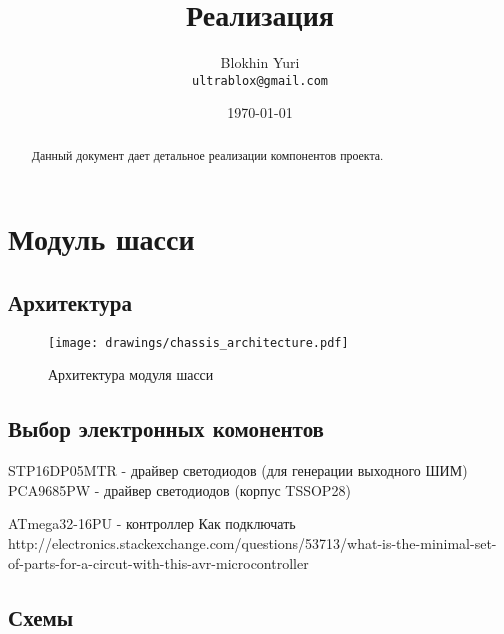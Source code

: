 \documentclass[utf8]{report}
\begin{document}
\title{Реализация}
\author{Blokhin Yuri\\
        \texttt{ultrablox@gmail.com}}
\date{\today}
\maketitle
 
\tableofcontents

\begin{abstract}
Данный документ дает детальное реализации компонентов проекта.
\end{abstract}

\chapter{Модуль шасси}

\section{Архитектура}


\begin{figure}
    \centering
    \texttt{[image: drawings/chassis\_architecture.pdf]}
    \caption{Архитектура модуля шасси}
    \label{fig:hashset}
\end{figure}

\section{Выбор электронных комонентов}

STP16DP05MTR - драйвер светодиодов (для генерации выходного ШИМ)
PCA9685PW - драйвер светодиодов (корпус TSSOP28)

ATmega32-16PU - контроллер
Как подключать http://electronics.stackexchange.com/questions/53713/what-is-the-minimal-set-of-parts-for-a-circut-with-this-avr-microcontroller

\section{Схемы}

\begin{thebibliography}{9}

\end{thebibliography}
 
\end{document}
